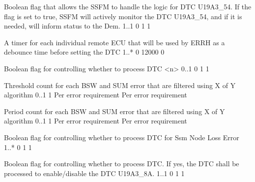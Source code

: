 { }


{Boolean flag that allows the SSFM to handle the logic for DTC U19A3_54. 
If the flag is set to true, SSFM will actively monitor the DTC U19A3_54, and if it is needed, will inform status to the Dem. 
}
{1..1}
{0}
{1}
{1}

{     }


{A timer for each individual remote ECU that will be used by ERRH as a debounce time before setting the DTC}
{1..*}
{0}
{12000}
{0}

{     }

{Boolean flag for controlling whether to process DTC <n>}
{0..1}
{0}
{1}
{1}

{} 

{Threshold count for each BSW and SUM error that are filtered using X of Y algorithm}
{0..1}
{1}
{Per error requirement}
{Per error requirement}

{  }

{Period count for each BSW and SUM error that are filtered using X of Y algorithm}
{0..1}
{1}
{Per error requirement}
{Per error requirement}

{  }

{Boolean flag for controlling whether to process DTC for Ssm Node Loss Error}
{1..*}
{0}
{1}
{1}

{} 


{Boolean flag for controlling whether to process DTC. If yes, the DTC shall be processed to enable/disable the DTC U19A3_8A.}
{1..1}
{0}
{1}
{1}

